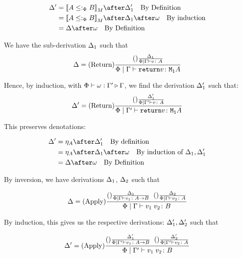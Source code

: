 \documentclass{report}
\begin{document}
    \begin{align}
        \D' & = \deno{A\subtypep B}\after \D_1' \qt{By Definition} \\
        & = \deno{A\subtypep B}\after \D_1\after\w \qt{By induction}\\
        & = \D\after\w \qt{By Definition}\\
    \end{align}

    We have the sub-derivation $\Delta_1$ such that
    \begin{equation}
        \Delta = (\text{Return}) \frac{(\text{}) \frac{\Delta_1}{\Phi\mid\Gamma \vdash v \colon A}}{\Phi\mid\Gamma \vdash \texttt{return} v \colon \texttt{M}_{\texttt{1}}{A}}
    \end{equation}

    Hence, by induction, with $\Phi\vdash \omega : \Gamma' \triangleright \Gamma$, we find the derivation $\Delta_1'$ such that:
    \begin{equation}
        \Delta' = (\text{Return}) \frac{(\text{}) \frac{\Delta_1'}{\Phi\mid\Gamma' \vdash v \colon A}}{\Phi\mid\Gamma' \vdash \texttt{return} v \colon \texttt{M}_{\texttt{1}}{A}}
    \end{equation}

    This preserves denotations:

    \begin{align}
        \D' & = \point{A}\after\D_1' \qt{By definition}\\
            & = \point{A}\after\D_1\after\w\qt{By induction of $\D_1, \D_1'$}\\
            & = \D\after\w\qt{By Definition}
    \end{align}

        By inversion, we have derivations $\Delta_1$, $\Delta_2$ such that

        \begin{equation}
            \Delta = 
            (\text{Apply}) \frac{
                (\text{}) \frac{\Delta_1}{\Phi\mid\Gamma \vdash v_1 \colon A\rightarrow B}
                \;\;
                (\text{}) \frac{\Delta_2}{\Phi\mid\Gamma \vdash v_2 \colon A}
            }{
                \Phi\mid\Gamma \vdash v_1\; v_2 \colon B
            }
        \end{equation}

        By induction, this gives us the respective derivations: $\Delta_1',\Delta_2'$ such that

        
        \begin{equation}
            \Delta' = 
            (\text{Apply}) \frac{
                (\text{}) \frac{\Delta_1'}{\Phi\mid\Gamma' \vdash v_1 \colon A\rightarrow B}
                \;\;
                (\text{}) \frac{\Delta_2'}{\Phi\mid\Gamma' \vdash v_2 \colon A}
            }{
                \Phi\mid\Gamma' \vdash v_1\; v_2 \colon B
            }
        \end{equation}
\end{document}
